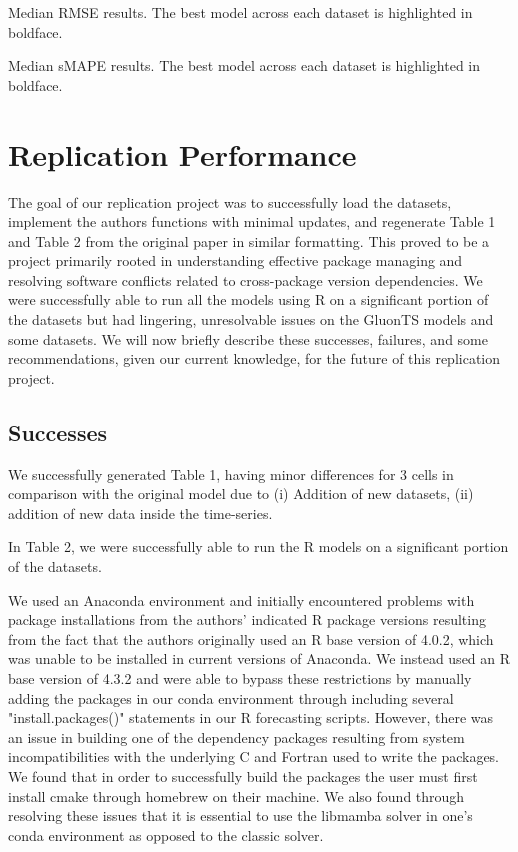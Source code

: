 \begin{table}[H]
    \caption{Median RMSE results. The best model across each dataset is highlighted in boldface.}
    \centering
    \resizebox{\textwidth}{!}{
    
    }
    \label{table:table_median_rmse.tex}
\end{table}

\begin{table}[H]
    \caption{Median sMAPE results. The best model across each dataset is highlighted in boldface.}
    \centering
    \resizebox{\textwidth}{!}{
    
    }
    \label{table:table_median_smape.tex}
\end{table}

\section{Replication Performance}
The goal of our replication project was to successfully load the datasets, implement the authors functions with minimal updates, and regenerate Table 1 and Table 2 from the original paper in similar formatting. This proved to be a project primarily rooted in understanding effective package managing and resolving software conflicts related to cross-package version dependencies. We were successfully able to run all the models using R on a significant portion of the datasets but had lingering, unresolvable issues on the GluonTS models and some datasets. We will now briefly describe these successes, failures, and some recommendations, given our current knowledge, for the future of this replication project. 

\subsection{Successes}
We successfully generated Table 1, having minor differences for 3 cells in comparison with the original model due to (i) Addition of new datasets, (ii) addition of new data inside the time-series.

In Table 2, we were successfully able to run the R models on a significant portion of the datasets. 

We used an Anaconda environment and initially encountered problems with package installations from the authors' indicated R package versions resulting from the fact that the authors originally used an R base version of 4.0.2, which was unable to be installed in current versions of Anaconda. We instead used an R base version of 4.3.2 and were able to bypass these restrictions by manually adding the packages in our conda environment through including several "install.packages()" statements in our R forecasting scripts. However, there was an issue in building one of the dependency packages resulting from system incompatibilities with the underlying C and Fortran used to write the packages. We found that in order to successfully build the packages the user must first install cmake through homebrew on their machine. We also found through resolving these issues that it is essential to use the libmamba solver in one's conda environment as opposed to the classic solver. 

